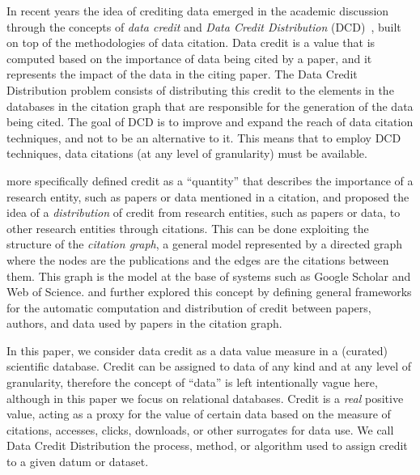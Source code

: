 
In recent years the idea of crediting data emerged in the academic discussion through the concepts of \emph{data credit} and \emph{Data Credit Distribution} (DCD)~\citep{creditFang18,transitiveCreditKatz2014,zeng2020assigning}, built on top of the methodologies of data citation. 
Data credit is a value that is computed based on the importance of data being cited by a paper, and it represents the impact of the data in the citing paper. 
The Data Credit Distribution problem consists of distributing this credit to the elements in the databases in the citation graph that are responsible for the generation of the data being cited. The goal of DCD is to improve and expand the reach of data citation techniques, and not to be an alternative to it. This means that to employ DCD techniques, data citations (at any level of granularity) must be available.

\cite{katz2020SoftwareandData} more specifically defined credit as a ``quantity'' that describes the importance of a research entity, such as papers or data mentioned in a citation, and proposed the idea of a \emph{distribution} of credit from research entities, such as papers or data, to other research entities through citations. 
This can be done exploiting the structure of the \emph{citation graph}, a general model represented by a directed graph where the nodes are the publications and the edges are the citations between them.
This graph is the model at the base of systems such as Google Scholar and Web of Science.
\cite{zeng2020assigning} and \cite{creditFang18} further explored this concept by defining general frameworks for the automatic computation and distribution of credit between papers, authors, and data used by papers in the citation graph. 

In this paper, we consider data credit as a data value measure in a (curated) scientific database. Credit can be assigned to data of any kind and at any level of granularity, therefore the concept of ``data'' is left intentionally vague here, although in this paper we focus on relational databases.
Credit is a \emph{real} positive value, acting as a proxy for the value of certain data based on the measure of citations, accesses, clicks, downloads, or other surrogates for data use. We call Data Credit Distribution the process, method, or algorithm used to assign credit to a given datum or dataset.


